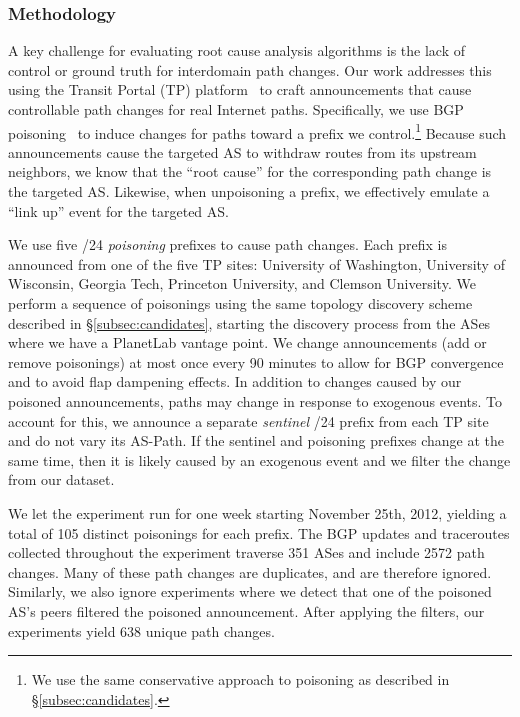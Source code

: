\subsubsection{Methodology}

A key challenge for evaluating root cause analysis algorithms is the
lack of control or ground truth for interdomain path changes.  Our work
addresses this using the Transit Portal (TP) platform~\cite{bgpmux} to
craft announcements that cause controllable path changes for real
Internet paths. Specifically, we use BGP poisoning~\cite{optometry} to
induce changes for paths toward a prefix we control.\footnote{We use the
same conservative approach to poisoning as described in
\S\ref{subsec:candidates}.} Because such announcements cause the
targeted AS to withdraw routes from its upstream neighbors, we know that
the ``root cause'' for the corresponding path change is the targeted AS.
Likewise, when unpoisoning a prefix, we effectively emulate a ``link
up'' event for the targeted AS.

We use five /24 \emph{poisoning} prefixes to cause path changes.  
Each prefix is announced from one of the five TP sites:
University of Washington, University of Wisconsin, Georgia Tech,
Princeton University, and Clemson University.
We perform a sequence of poisonings using the same
topology discovery scheme described in \S\ref{subsec:candidates},
starting the discovery process from the ASes where we have a PlanetLab
vantage point.  We change announcements (add or remove poisonings) at
most once every 90 minutes to allow for BGP convergence and to avoid
flap dampening effects. 
In addition to changes caused by our poisoned announcements, paths may 
change in response to exogenous events. To account for this, we announce 
a separate \emph{sentinel} /24 prefix from each TP site and do not vary its AS-Path. If 
the sentinel and poisoning prefixes change at the same time, then it is likely 
caused by an exogenous event and we filter the change from our dataset.

We let the experiment run for one week starting November 25th, 2012,
yielding a total of 105 distinct poisonings for each prefix.  The
BGP updates and traceroutes collected throughout the experiment traverse
351 ASes and include 2572 path changes. Many of these path changes
are duplicates, and are therefore ignored. 
Similarly, we also ignore experiments where we detect that
one of the poisoned AS's peers filtered the poisoned announcement.
After applying the filters, our experiments yield 638 unique
path changes.  


